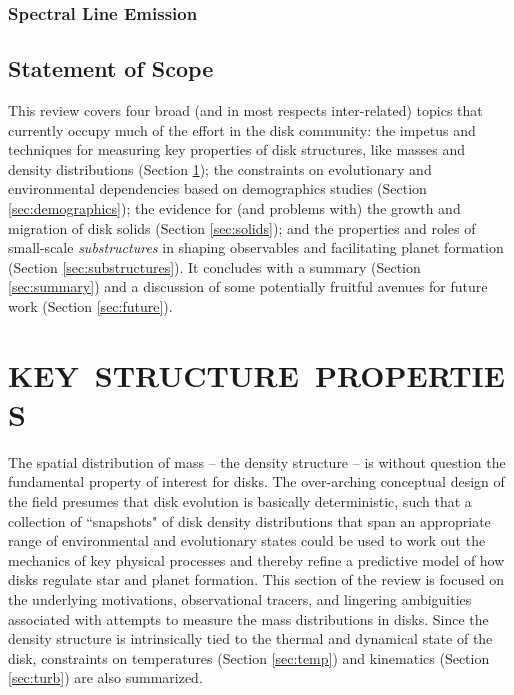 \documentclass[a4paper]{ar-1col}
\begin{document}
\subsubsection{Spectral Line Emission}




\subsection{Statement of Scope} \label{sec:scope}

This review covers four broad (and in most respects inter-related) topics that currently occupy much of the effort in the disk community: the impetus and techniques for measuring key properties of disk structures, like masses and density distributions (Section \ref{sec:structure}); the constraints on evolutionary and environmental dependencies based on demographics studies (Section \ref{sec:demographics}); the evidence for (and problems with) the growth and migration of disk solids (Section \ref{sec:solids}); and the properties and roles of small-scale {\it substructures} in shaping observables and facilitating planet formation (Section \ref{sec:substructures}).  It concludes with a summary (Section \ref{sec:summary}) and a discussion of some potentially fruitful avenues for future work (Section \ref{sec:future}).  




\section{KEY\ STRUCTURE\ PROPERTIES} \label{sec:structure}

The spatial distribution of mass -- the density structure -- is without question the fundamental property of interest for disks.  The over-arching conceptual design of the field presumes that disk evolution is basically deterministic, such that a collection of ``snapshots" of disk density distributions that span an appropriate range of environmental and evolutionary states could be used to work out the mechanics of key physical processes and thereby refine a predictive model of how disks regulate star and planet formation.  This section of the review is focused on the underlying motivations, observational tracers, and lingering ambiguities associated with attempts to measure the mass distributions in disks.  Since the density structure is intrinsically tied to the thermal and dynamical state of the disk, constraints on temperatures (Section \ref{sec:temp}) and kinematics (Section \ref{sec:turb}) are also summarized.        
\end{document}
